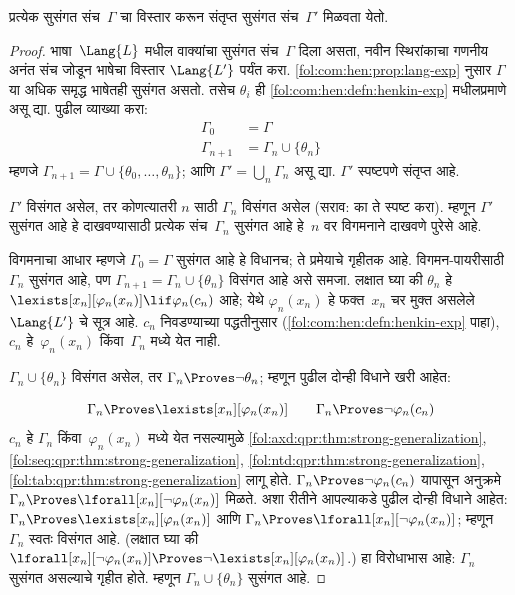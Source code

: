 \begin{lem}
\label{fol:com:hen:lem:henkin}
प्रत्येक सुसंगत संच~$\Gamma$ चा विस्तार करून संतृप्त सुसंगत
संच~$\Gamma'$ मिळवता येतो.
\end{lem}

\begin{proof}
भाषा~$\Lang{L}$ मधील वाक्यांचा सुसंगत संच~$\Gamma$ दिला असता,
नवीन स्थिरांकाचा गणनीय अनंत संच जोडून भाषेचा विस्तार
$\Lang{L'}$ पर्यंत करा. \ref{fol:com:hen:prop:lang-exp} नुसार $\Gamma$ या अधिक
समृद्ध भाषेतही सुसंगत असतो. तसेच $\theta_i$ ही
\ref{fol:com:hen:defn:henkin-exp} मधीलप्रमाणे असू द्या. पुढील व्याख्या करा:
\begin{align*}
\Gamma_0 & = \Gamma \\
\Gamma_{n+1} & = \Gamma_n \cup \{\theta_n \}
\end{align*}
म्हणजे $\Gamma_{n+1} = \Gamma \cup \{ \theta_0, \dots, \theta_n \}$; आणि
$\Gamma' = \bigcup_{n} \Gamma_n$ असू द्या. $\Gamma'$ स्पष्टपणे संतृप्त आहे.

$\Gamma'$ विसंगत असेल, तर कोणत्यातरी $n$ साठी $\Gamma_n$ विसंगत असेल
(सराव: का ते स्पष्ट करा). म्हणून $\Gamma'$ सुसंगत आहे हे दाखवण्यासाठी
प्रत्येक संच~$\Gamma_n$ सुसंगत आहे हे~$n$ वर विगमनाने दाखवणे पुरेसे आहे.

विगमनाचा आधार म्हणजे $\Gamma_0 = \Gamma$ सुसंगत आहे हे विधानच; ते
प्रमेयाचे गृहीतक आहे. विगमन-पायरीसाठी $\Gamma_{n}$ सुसंगत आहे, पण
$\Gamma_{n+1} = \Gamma_n \cup \{\theta_n\}$ विसंगत आहे असे समजा. लक्षात
घ्या की $\theta_n$ हे
$\lexists[x_{n}][\varphi_{n}(x_n)] \lif \varphi_{n}(c_{n})$
आहे; येथे $\varphi_n(x_n)$ हे फक्त~$x_n$ चर मुक्त असलेले $\Lang{L'}$ चे
सूत्र आहे. $c_n$ निवडण्याच्या पद्धतीनुसार
(\ref{fol:com:hen:defn:henkin-exp} पाहा), $c_n$ हे~$\varphi_n(x_n)$ किंवा~$\Gamma_n$
मध्ये येत नाही.

$\Gamma_n \cup \{\theta_n\}$ विसंगत असेल, तर $\Gamma_n
\Proves \lnot \theta_n$; म्हणून पुढील दोन्ही विधाने खरी आहेत:

\[\Gamma_n \Proves \lexists[x_n][\varphi_n(x_n)]
\qquad
\Gamma_n \Proves \lnot \varphi_n(c_n)
\]
$c_n$ हे $\Gamma_n$ किंवा~$\varphi_n(x_n)$ मध्ये येत नसल्यामुळे
\ref{fol:axd:qpr:thm:strong-generalization}, \ref{fol:seq:qpr:thm:strong-generalization}, \ref{fol:ntd:qpr:thm:strong-generalization}, \ref{fol:tab:qpr:thm:strong-generalization}
लागू होते.
$\Gamma_n \Proves \lnot \varphi_n(c_n)$
यापासून अनुक्रमे
$\Gamma_n \Proves \lforall[x_n][\lnot \varphi_n(x_n)]$
मिळते. अशा रीतीने आपल्याकडे पुढील दोन्ही विधाने आहेत:
$\Gamma_n \Proves \lexists[x_n][\varphi_n(x_n)]$ आणि
$\Gamma_n \Proves \lforall[x_n][\lnot \varphi_n(x_n)]$;
म्हणून $\Gamma_n$ स्वतः विसंगत आहे.
(लक्षात घ्या की
$\lforall[x_n][\lnot \varphi_n(x_n)] \Proves
  \lnot\lexists[x_n][\varphi_n(x_n)]$.)
हा विरोधाभास आहे: $\Gamma_n$ सुसंगत असल्याचे गृहीत होते. म्हणून
$\Gamma_n \cup \{ \theta_n\}$ सुसंगत आहे.

\end{proof}

